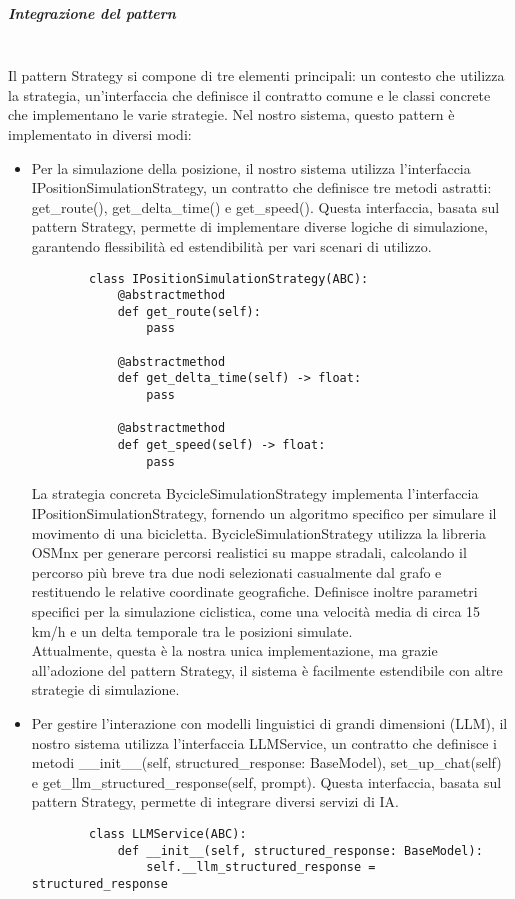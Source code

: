 \documentclass[10pt]{article}
\newcommand{\mysubparagraph}[1]{\subparagraph{#1}\mbox{}\\}
\begin{document}
    \mysubparagraph{Integrazione del pattern}
    Il pattern Strategy si compone di tre elementi principali: un contesto che utilizza la strategia, un'interfaccia che definisce il contratto comune e le classi concrete che implementano le varie strategie. Nel nostro sistema, questo pattern è implementato in diversi modi:
    \begin{itemize}
        \item Per la simulazione della posizione, il nostro sistema utilizza l'interfaccia IPositionSimulationStrategy, un contratto che definisce tre metodi astratti: get\_route(), get\_delta\_time() e get\_speed(). Questa interfaccia, basata sul pattern Strategy, permette di implementare diverse logiche di simulazione, garantendo flessibilità ed estendibilità per vari scenari di utilizzo.
        \begin{lstlisting}
        class IPositionSimulationStrategy(ABC):
            @abstractmethod
            def get_route(self):
                pass
            
            @abstractmethod
            def get_delta_time(self) -> float:
                pass
            
            @abstractmethod
            def get_speed(self) -> float:
                pass
        \end{lstlisting}
        La strategia concreta BycicleSimulationStrategy implementa l'interfaccia IPositionSimulationStrategy, fornendo un algoritmo specifico per simulare il movimento di una bicicletta.
        BycicleSimulationStrategy utilizza la libreria OSMnx per generare percorsi realistici su mappe stradali, calcolando il percorso più breve tra due nodi selezionati casualmente dal grafo e restituendo le relative coordinate geografiche. Definisce inoltre parametri specifici per la simulazione ciclistica, come una velocità media di circa 15 km/h e un delta temporale tra le posizioni simulate.\\
        Attualmente, questa è la nostra unica implementazione, ma grazie all'adozione del pattern Strategy, il sistema è facilmente estendibile con altre strategie di simulazione.
        
        \item Per gestire l'interazione con modelli linguistici di grandi dimensioni (LLM), il nostro sistema utilizza l'interfaccia LLMService, un contratto che definisce i metodi \_\_init\_\_(self, structured\_response: BaseModel), set\_up\_chat(self) e get\_llm\_structured\_response(self, prompt). Questa interfaccia, basata sul pattern Strategy, permette di integrare diversi servizi di IA.
        \begin{lstlisting}
        class LLMService(ABC):
            def __init__(self, structured_response: BaseModel):
                self.__llm_structured_response = structured_response


\end{lstlisting}
\end{itemize}
\end{document}
